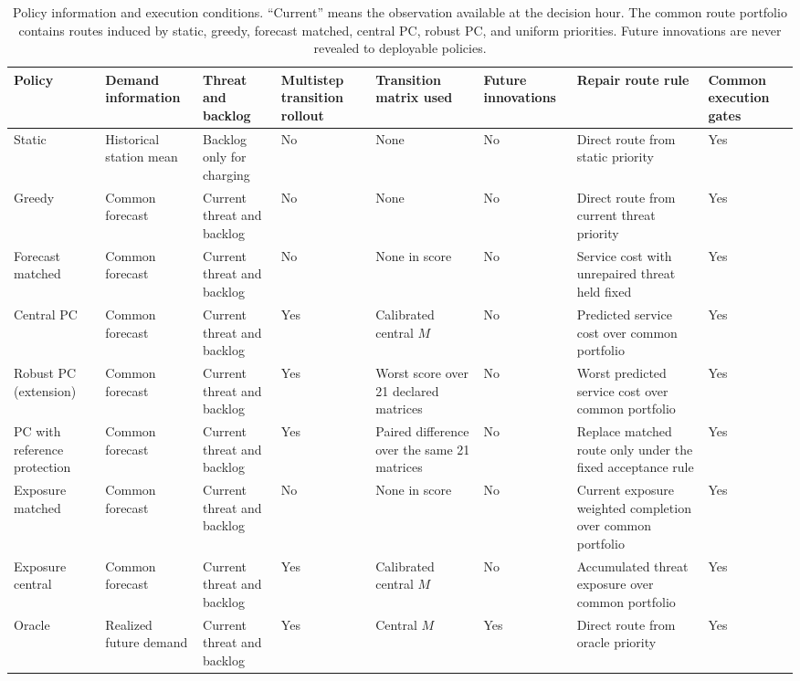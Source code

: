 \begin{table}[t]
\centering
\caption{Policy information and execution conditions.  ``Current'' means the
observation available at the decision hour.  The common route portfolio contains
routes induced by static, greedy, forecast matched, central PC, robust PC, and
uniform priorities.  Future innovations are never revealed to deployable
policies.}
\label{tab:policy-definitions}
\scriptsize
\setlength{\tabcolsep}{2.4pt}
\begin{tabular}{p{}p{}p{}p{}p{}p{}p{}p{}}
\toprule
Policy & Demand information & Threat and backlog & Multistep transition rollout & Transition matrix used & Future innovations & Repair route rule & Common execution gates \\
\midrule
Static & Historical station mean & Backlog only for charging & No & None & No & Direct route from static priority & Yes \\
Greedy & Common forecast & Current threat and backlog & No & None & No & Direct route from current threat priority & Yes \\
Forecast matched & Common forecast & Current threat and backlog & No & None in score & No & Service cost with unrepaired threat held fixed & Yes \\
Central PC & Common forecast & Current threat and backlog & Yes & Calibrated central $M$ & No & Predicted service cost over common portfolio & Yes \\
Robust PC (extension) & Common forecast & Current threat and backlog & Yes & Worst score over 21 declared matrices & No & Worst predicted service cost over common portfolio & Yes \\
PC with reference protection & Common forecast & Current threat and backlog & Yes & Paired difference over the same 21 matrices & No & Replace matched route only under the fixed acceptance rule & Yes \\
Exposure matched & Common forecast & Current threat and backlog & No & None in score & No & Current exposure weighted completion over common portfolio & Yes \\
Exposure central & Common forecast & Current threat and backlog & Yes & Calibrated central $M$ & No & Accumulated threat exposure over common portfolio & Yes \\
Oracle & Realized future demand & Current threat and backlog & Yes & Central $M$ & Yes & Direct route from oracle priority & Yes \\
\bottomrule
\end{tabular}
\end{table}
